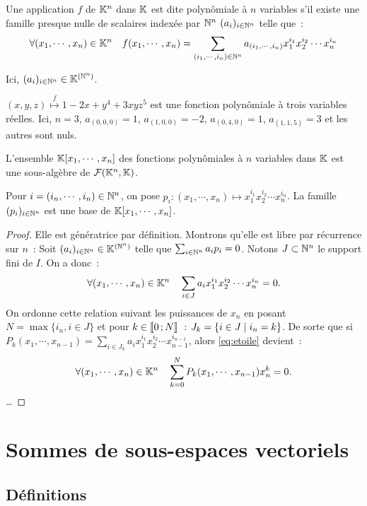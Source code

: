 \begin{defdef}
	Une application $f$ de $\mathbb{K}^n$ dans $\mathbb{K}$ est dite polynômiale à $n$ variables s'il existe une famille presque nulle de scalaires indexée par $\mathbb{N}^n$  $(a_i)_{i \in \mathbb{N}^n}$ telle que~:
	\begin{equation}
		\forall (x_1, \cdots, x_n) \in \mathbb{K}^n \quad f(x_1, \cdots, x_n) = \sum_{(i_1, \cdots, i_n) \in \mathbb{N}^n} a_{(i_1, \cdots, i_n)} x_1^{i_1} x_2^{i_2} \cdots x_n^{i_n}
	\end{equation}
\end{defdef}

\begin{remarque}
	Ici, $(a_i)_{i \in \mathbb{N}^n} \in \mathbb{K}^{(\mathbb{N}^n)}$.
\end{remarque}
\begin{exemple}
	$(x,y,z) \overset{f}{\longmapsto} 1-2x+y^4+3xyz^5$ est une fonction polynômiale à trois variables réelles. Ici, $n=3$, $a_{(0,0,0)}=1$, $a_{(1,0,0)}=-2$, $a_{(0,4,0)}=1$, $a_{(1,1,5)}=3$ et les autres sont nuls.
\end{exemple}
\begin{prop}
	L'ensemble $\mathbb{K}[x_1, \cdots, x_n]$ des fonctions polynômiales à $n$ variables dans $\mathbb{K}$ est une sous-algèbre de $\mathcal{F}(\mathbb{K}^n, \mathbb{K})$.
\end{prop}
\begin{prop}
	Pour $i = (i_n, \cdots, i_n) \in \mathbb{N}^n$, on pose $p_i : (x_1, \cdots, x_n) \longmapsto x_1^{i_1} x_2^{i_2} \cdots x_n^{i_n}$. La famille $(p_i)_{i \in \mathbb{N}^n}$ est une base de $\mathbb{K}[x_1, \cdots, x_n]$.
\end{prop}
\begin{proof}
	Elle est génératrice par définition. Montrons qu'elle est libre par récurrence sur $n$~:
	Soit $(a_i)_{i \in \mathbb{N}^n} \in \mathbb{K}^{(\mathbb{N}^n)}$ telle que $\sum_{i \in \mathbb{N}^n} a_i p_i =0$. Notons $J \subset \mathbb{N}^n$ le support fini de $I$. On a donc~:
	\begin{equation}
		\label{eq:etoile}
		\forall (x_1, \cdots, x_n) \in \mathbb{K}^n \quad \sum_{i \in J} a_i x_1^{i_1} x_2^{i_2} \cdots x_n^{i_n} = 0.
	\end{equation}
	On ordonne cette relation suivant les puissances de $x_n$ en posant $N = \max\{i_n, i \in J\}$ et pour $k \in \mathopen{\llbracket}0\mathclose{}\mathpunct{};N\mathclose{\rrbracket}$~: $J_k = \left\{i \in J\mathrel{}\middle|\mathrel{}i_n=k\right\}$. De sorte que si $P_k(x_1, \cdots, x_{n-1}) = \sum_{i \in J_k} a_i x_1^{i_1} x_2^{i_2} \cdots x_{n-1}^{i_{n-1}}$, alors \eqref{eq:etoile} devient~:
	\begin{equation}
		\forall (x_1, \cdots, x_n) \in \mathbb{K}^n \quad \sum_{k=0}^N P_k(x_1, \cdots, x_{n-1}) x_n^k = 0.
	\end{equation}
	\ldots
\end{proof}

\section{Sommes de sous-espaces vectoriels}
\subsection{Définitions}